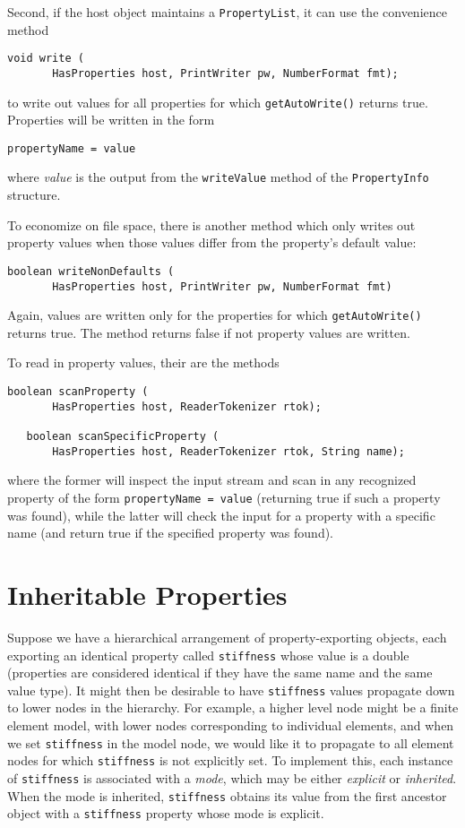 Second, if the host object maintains a {\tt PropertyList},
it can use the convenience method 
\begin{lstlisting}[]
   void write (
       HasProperties host, PrintWriter pw, NumberFormat fmt);
\end{lstlisting}
to write out values for all properties for which 
{\tt getAutoWrite()} returns true. Properties will be written in
the form
\begin{lstlisting}[]
   propertyName = value  
\end{lstlisting}
where {\it value} is the output from the {\tt writeValue}
method of the {\tt PropertyInfo} structure.

To economize on file space, there is another method 
which only writes out property values when those 
values differ from the property's default value:
\begin{lstlisting}[]
   boolean writeNonDefaults (
       HasProperties host, PrintWriter pw, NumberFormat fmt)
\end{lstlisting}
Again, values are written only for the properties for which 
{\tt getAutoWrite()} returns true. The method returns false if not property
values are written.

To read in property values, their are the methods 
\begin{lstlisting}[]
   boolean scanProperty (
       HasProperties host, ReaderTokenizer rtok);

   boolean scanSpecificProperty (
       HasProperties host, ReaderTokenizer rtok, String name);
\end{lstlisting}
where the former will inspect the input stream and scan in any
recognized property of the form {\tt propertyName = value} (returning
true if such a property was found), while the latter will check the
input for a property with a specific name (and return true if the
specified property was found).

\section{Inheritable Properties}

Suppose we have a hierarchical arrangement of property-exporting
objects, each exporting an identical property called {\tt stiffness}
whose value is a double (properties are considered identical if they
have the same name and the same value type). It might then be
desirable to have {\tt stiffness} values propagate down to lower nodes
in the hierarchy. For example, a higher level node might be a finite
element model, with lower nodes corresponding to individual elements,
and when we set {\tt stiffness} in the model node, we would like it to
propagate to all element nodes for which {\tt stiffness} is not
explicitly set. To implement this, each instance of {\tt stiffness} is
associated with a {\it mode}, which may be either {\it explicit} or
{\it inherited}. When the mode is inherited, {\tt stiffness} obtains
its value from the first ancestor object with a {\tt stiffness}
property whose mode is explicit.

